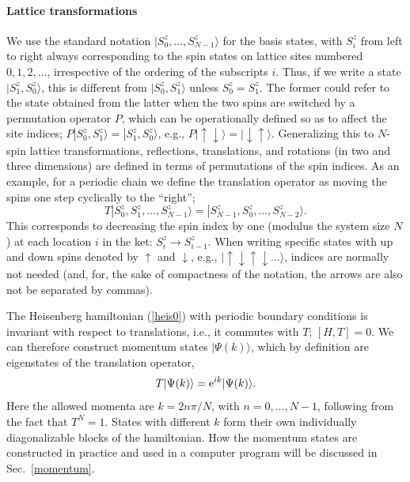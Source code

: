 \documentclass[draft,numberedheadings]{aipproc}
\newcommand{\dn}{\downarrow}
\newcommand{\up}{\uparrow}
\begin{document}
\paragraph{Lattice transformations}

We use the standard notation $|S^z_0,\ldots,S^z_{N-1}\rangle$ for the basis states, with $S^z_i$ from left to right always corresponding to the spin
states on lattice sites numbered $0,1,2,...$, irrespective of the ordering of the subscripts $i$. Thus, if we write a state $|S^z_1,S^z_0\rangle$, this is 
different from $|S^z_0,S^z_1\rangle$ unless $S^z_0=S^z_1$. The former could  refer to the state obtained from the latter when the two spins are switched 
by a permutation operator $P$, which can be operationally defined so as to affect the site indices; $P|S^z_0,S^z_1\rangle=|S^z_1,S^z_0\rangle$, e.g., 
$P|\up\dn\rangle=|\dn\up\rangle$. Generalizing this to $N$-spin lattice transformations, reflections, translations, and rotations (in two and three 
dimensions) are defined in terms of permutations of the spin indices. As an example, for a periodic chain we define the translation operator as
moving the spins one step cyclically to the ``right''; 
\begin{equation}
T|S^z_0,S^z_1,\ldots,S^z_{N-1}\rangle=|S^z_{N-1},S^z_0,\ldots,S^z_{N-2}\rangle. 
\label{tdef}
\end{equation}
This corresponds to decreasing the spin index by one (modulus the system size $N$) at each location $i$ in the ket: $S^z_i \to S^z_{i-1}$. When writing specific 
states with up and down spins denoted by $\up$ and $\dn$, e.g., $|\up\dn\up\dn\ldots\rangle$, indices are normally not needed (and, for, the sake of compactness 
of the notation, the arrows are also not be separated by commas). 

The Heisenberg hamiltonian (\ref{heis0}) with periodic boundary conditions is invariant with respect to translations, i.e., it commutes with $T$;
$[H,T]=0$. We can therefore construct momentum states $|\Psi(k)\rangle$, which by definition are eigenstates of the translation operator,
\begin{equation}
T|\Psi(k)\rangle = {\rm e}^{ik}|\Psi(k)\rangle.
\label{kstateproperty}
\end{equation}
Here the allowed momenta are $k=2n\pi/N$, with $n=0,\ldots,N-1$, following from the fact that $T^N=1$. States with different $k$ form their own individually
diagonalizable blocks of the hamiltonian. How the momentum states are constructed in practice and used in a computer program will be discussed in Sec.~\ref{momentum}.
\end{document}
